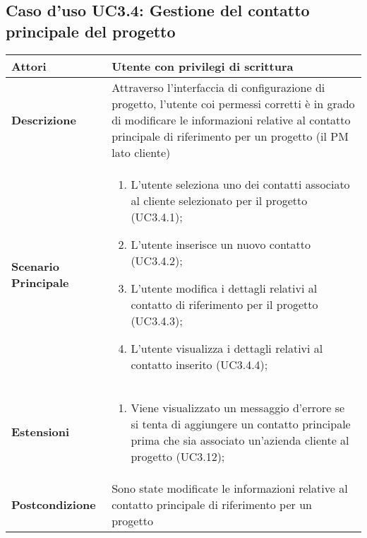	\subsection{Caso d'uso UC3.4: Gestione del contatto principale del progetto}
	\begin{longtable}{ | p{2.7cm} | p{12cm} |}
		\hline \textbf{Attori} & Utente con privilegi di scrittura\\ 
		\hline \textbf{Descrizione} & Attraverso l’interfaccia di configurazione di progetto, l’utente coi permessi corretti è in grado di modificare le informazioni relative al contatto principale di riferimento per un progetto (il PM lato cliente)\\ 
		\hline \textbf{Scenario Principale} & \begin{enumerate}
			\item L’utente seleziona uno dei contatti associato al cliente selezionato per il progetto  (UC3.4.1);
			\item L’utente inserisce un nuovo contatto  (UC3.4.2);
			\item L’utente modifica i dettagli relativi al contatto di riferimento per il progetto  (UC3.4.3);
			\item L’utente visualizza i dettagli relativi al contatto inserito  (UC3.4.4);
			
		\end{enumerate}
		\\ 
		\hline \textbf{Estensioni} & \begin{enumerate}
			\item Viene visualizzato un messaggio d'errore se si tenta di aggiungere un contatto principale prima che sia associato un'azienda cliente al progetto (UC3.12);
			
		\end{enumerate}
		\\ 
		\hline \textbf{Postcondizione} & Sono state modificate le informazioni relative al contatto principale di riferimento per un progetto \\ 
		\hline 
	\end{longtable}
	
	\hypertarget{UC3.5}{}
